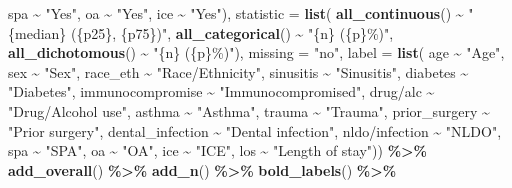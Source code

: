 \documentclass[
]{article}
\newenvironment{Shaded}{\begin{snugshade}}{\end{snugshade}}
\newcommand{\AttributeTok}[1]{\textcolor[rgb]{0.13,0.29,0.53}{#1}}
\newcommand{\FunctionTok}[1]{\textcolor[rgb]{0.13,0.29,0.53}{\textbf{#1}}}
\newcommand{\NormalTok}[1]{#1}
\newcommand{\SpecialCharTok}[1]{\textcolor[rgb]{0.81,0.36,0.00}{\textbf{#1}}}
\newcommand{\StringTok}[1]{\textcolor[rgb]{0.31,0.60,0.02}{#1}}
\begin{document}
\begin{Shaded}
\begin{Highlighting}[]
\NormalTok{      spa }\SpecialCharTok{\textasciitilde{}} \StringTok{"Yes"}\NormalTok{,}
\NormalTok{      oa }\SpecialCharTok{\textasciitilde{}} \StringTok{"Yes"}\NormalTok{,}
\NormalTok{      ice }\SpecialCharTok{\textasciitilde{}} \StringTok{"Yes"}\NormalTok{),}
    \AttributeTok{statistic =} \FunctionTok{list}\NormalTok{(}
      \FunctionTok{all\_continuous}\NormalTok{() }\SpecialCharTok{\textasciitilde{}} \StringTok{"\{median\} (\{p25\}, \{p75\})"}\NormalTok{,}
      \FunctionTok{all\_categorical}\NormalTok{() }\SpecialCharTok{\textasciitilde{}} \StringTok{"\{n\} (\{p\}\%)"}\NormalTok{,}
      \FunctionTok{all\_dichotomous}\NormalTok{() }\SpecialCharTok{\textasciitilde{}} \StringTok{"\{n\} (\{p\}\%)"}\NormalTok{),}
    \AttributeTok{missing =} \StringTok{"no"}\NormalTok{,}
    \AttributeTok{label =} \FunctionTok{list}\NormalTok{(}
\NormalTok{      age }\SpecialCharTok{\textasciitilde{}} \StringTok{"Age"}\NormalTok{,}
\NormalTok{      sex }\SpecialCharTok{\textasciitilde{}} \StringTok{"Sex"}\NormalTok{,}
\NormalTok{      race\_eth }\SpecialCharTok{\textasciitilde{}} \StringTok{"Race/Ethnicity"}\NormalTok{,}
\NormalTok{      sinusitis }\SpecialCharTok{\textasciitilde{}} \StringTok{"Sinusitis"}\NormalTok{,}
\NormalTok{      diabetes }\SpecialCharTok{\textasciitilde{}} \StringTok{"Diabetes"}\NormalTok{,}
\NormalTok{      immunocompromise }\SpecialCharTok{\textasciitilde{}} \StringTok{"Immunocompromised"}\NormalTok{,}
      \StringTok{\textasciigrave{}}\AttributeTok{drug/alc}\StringTok{\textasciigrave{}} \SpecialCharTok{\textasciitilde{}} \StringTok{"Drug/Alcohol use"}\NormalTok{,}
\NormalTok{      asthma }\SpecialCharTok{\textasciitilde{}} \StringTok{"Asthma"}\NormalTok{,}
\NormalTok{      trauma }\SpecialCharTok{\textasciitilde{}} \StringTok{"Trauma"}\NormalTok{,}
\NormalTok{      prior\_surgery }\SpecialCharTok{\textasciitilde{}} \StringTok{"Prior surgery"}\NormalTok{,}
\NormalTok{      dental\_infection }\SpecialCharTok{\textasciitilde{}} \StringTok{"Dental infection"}\NormalTok{,}
      \StringTok{\textasciigrave{}}\AttributeTok{nldo/infection}\StringTok{\textasciigrave{}} \SpecialCharTok{\textasciitilde{}} \StringTok{"NLDO"}\NormalTok{,}
\NormalTok{      spa }\SpecialCharTok{\textasciitilde{}} \StringTok{"SPA"}\NormalTok{,}
\NormalTok{      oa }\SpecialCharTok{\textasciitilde{}} \StringTok{"OA"}\NormalTok{,}
\NormalTok{      ice }\SpecialCharTok{\textasciitilde{}} \StringTok{"ICE"}\NormalTok{,}
\NormalTok{      los }\SpecialCharTok{\textasciitilde{}} \StringTok{"Length of stay"}\NormalTok{)) }\SpecialCharTok{\%\textgreater{}\%}
  \FunctionTok{add\_overall}\NormalTok{() }\SpecialCharTok{\%\textgreater{}\%} \FunctionTok{add\_n}\NormalTok{() }\SpecialCharTok{\%\textgreater{}\%} \FunctionTok{bold\_labels}\NormalTok{() }\SpecialCharTok{\%\textgreater{}\%} 

\end{Highlighting}
\end{Shaded}
\end{document}
